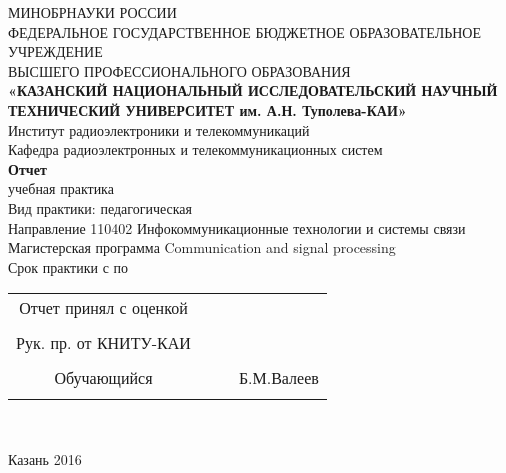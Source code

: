 
\begin{center}
\hfill \break
\large{МИНОБРНАУКИ РОССИИ}\\
\footnotesize{ФЕДЕРАЛЬНОЕ ГОСУДАРСТВЕННОЕ БЮДЖЕТНОЕ ОБРАЗОВАТЕЛЬНОЕ УЧРЕЖДЕНИЕ}\\ 
\footnotesize{ВЫСШЕГО ПРОФЕССИОНАЛЬНОГО ОБРАЗОВАНИЯ}\\
\small{\textbf{«КАЗАНСКИЙ НАЦИОНАЛЬНЫЙ ИССЛЕДОВАТЕЛЬСКИЙ НАУЧНЫЙ ТЕХНИЧЕСКИЙ УНИВЕРСИТЕТ им. А.Н. Туполева-КАИ»}}\\
\hfill \break
\normalsize{Институт радиоэлектроники и телекоммуникаций}\\
 \hfill \break
\normalsize{Кафедра радиоэлектронных и телекоммуникационных систем}\\
\hfill\break
\hfill \break
\hfill \break
\hfill \break
\hfill \break
\hfill \break
\hfill \break
\large{\textbf{Отчет}}\\
\normalsize{учебная практика}\\
\normalsize{Вид практики: педагогическая\\
\hfill \break
Направление  110402 Инфокоммуникационные технологии и системы связи
\hfill \break
Магистерская программа  Communication and signal processing\\
Срок практики с \underline{\hspace{3cm}} по \underline{\hspace{3cm}}}\\
\hfill \break
\hfill \break
\end{center}
 
 
\normalsize{ 
\begin{tabular}{cccc}
Отчет принял  с оценкой & \underline{\hspace{3cm}} &  \underline{\hspace{1cm}} &\underline{\hspace{3cm}} \\\\
Рук. пр. от КНИТУ-КАИ & \underline{\hspace{3cm}}& \underline{\hspace{1cm}}&\underline{\hspace{3cm}} \\\\
Обучающийся & \underline{\hspace{3cm}} & &Б.М.Валеев \\\\

\end{tabular}
}\\
\hfill \break
\hfill \break
\begin{center} Казань 2016 \end{center}
\thispagestyle{empty} %
 
 
\newpage

